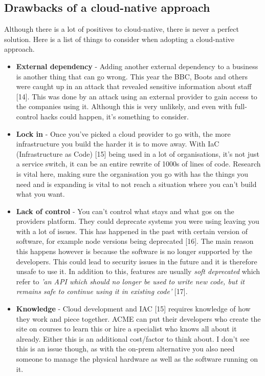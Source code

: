   \subsection{Drawbacks of a cloud-native approach}
  Although there is a lot of positives to cloud-native, there is never a perfect solution. Here is a list of things to consider when adopting a cloud-native
  approach.

  \begin{itemize}
    \item \textbf{External dependency} - Adding another external dependency to a business is another thing that can go wrong. This year the BBC, Boots and
    others were caught up in an attack that revealed sensitive information about staff [14]. This was done by an attack using an external provider to gain 
    access to the companies using it. Although this is very unlikely, and even with full-control hacks could happen, it's something to consider.
    \item \textbf{Lock in} - Once you've picked a cloud provider to go with, the more infrastructure you build the harder it is to move away. With 
    IaC (Infrastructure as Code) [15] being used in a lot of organisations, it's not just a service switch, it can be an entire rewrite of 1000s of lines
    of code. Research is vital here, making sure the organisation you go with has the things you need and is expanding is vital to not reach a situation where
    you can't build what you want. 
    \item \textbf{Lack of control} - You can't control what stays and what gos on the providers platform. They could deprecate systems you were using leaving 
    you with a lot of issues. This has happened in the past with certain version of software, for example node versions being deprecated [16]. The main
    reason this happens however is because the software is no longer supported by the developers. This could lead to security issues in the future and it is 
    therefore unsafe to use it. In addition to this, features are usually \textit{soft deprecated} which refer to \textit{'an API which should no longer be 
    used to write new code, but it remains safe to continue using it in existing code'} [17].
    \item \textbf{Knowledge} - Cloud development and IAC [15] requires knowledge of how they work and piece together. ACME can put their developers who create
    the site on courses to learn this or hire a specialist who knows all about it already. Either this is an additional cost/factor to think about. I 
    don't see this is an issue though, as with the on-prem alternative you also need someone to manage the physical hardware as well as the software 
    running on it.
  \end{itemize}

